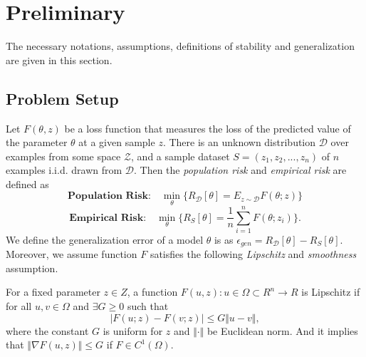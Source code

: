 \section{Preliminary}
The necessary notations, assumptions, definitions of stability and generalization are given in this section.

\subsection{Problem Setup}

Let $F(\theta, z)$ be a loss function that measures the loss of the predicted value of the parameter $\theta$ at a given sample $z$. There is an unknown distribution $\mathcal{D}$ over examples from some space $\mathcal{Z}$, and a sample dataset $S=(z_1, z_2,..., z_n)$ of $n$ examples i.i.d. drawn from $\mathcal{D}$. Then the \emph{population risk} and \emph{empirical risk} are defined as 
\begin{equation}
\textbf{Population Risk:}\quad   \min_\theta \{R_\mathcal{D}[\theta]=E_ {z \sim \mathcal{D}}F(\theta; z) \} \label{prm}
\end{equation}
\begin{equation}
\textbf{Empirical Risk:}\quad  \min_\theta \{ R_S [\theta]= \frac{1}{n} \sum_{i=1}^{n}F(\theta; z_i) \}.\label{erm}
\end{equation}
 We define the generalization error of a model $\theta$ is as $\epsilon_{gen}=R_\mathcal{D}[\theta] - R_S [\theta]$. 
 Moreover, we assume function $F$ satisfies the following \emph{Lipschitz} and \emph{smoothness} assumption.

\begin{definition}[Lipschitz]
For a fixed parameter $z\in Z$, a function $F(u,z):u\in\Omega \subset R^n \rightarrow R$ is Lipschitz if for all $u, v \in \Omega$ and $\exists G\geq 0$ such that 
    \begin{equation}\label{eq:l-lipschitz}
     \vert F(u;z)-F(v;z)\vert \leq G\Vert u-v\Vert,
    \end{equation}
where the constant $G$ is uniform for $z$ and $\Vert\cdot\Vert$ be Euclidean norm. And it implies that $\Vert\nabla F(u,z)\Vert \leq G$ if $F\in C^1(\Omega)$.
\end{definition}

